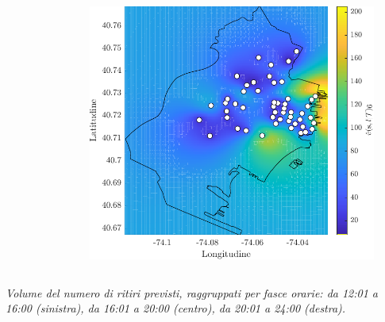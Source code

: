 \begin{frame}
\begin{columns}
\begin{column}{0.33\linewidth}
\begin{figure}
			\end{figure}
		\end{column}
		\begin{column}{0.33\linewidth}
			\centering
			\begin{figure}
				\includegraphics[width=\textwidth]{../Tesi/Immagini/4. Caso di studio/Kriging/Mappa volume, 6}
			\end{figure}
		\end{column}
	\end{columns}
	\textit{Volume del numero di ritiri previsti, raggruppati per fasce orarie: da 12:01 a 16:00 (sinistra), da 16:01 a 20:00 (centro), da 20:01 a 24:00 (destra).}
\end{frame}